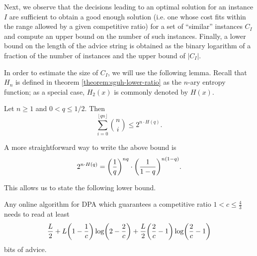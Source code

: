 Next, we observe that the decisions leading to an optimal solution for an
instance $I$ are sufficient to obtain a good enough solution (i.e. one
whose cost fits within the range allowed by a given competitive ratio) for
a set of ``similar'' instances $C_I$ and compute an upper bound on the
number of such instances. Finally, a lower bound on the length of the
advice string is obtained as the binary logarithm of a fraction of the
number of instances and the upper bound of $|C_I|$.

In order to estimate the size of $C_I$, we will use the following lemma.
Recall that $H_n$ is defined in theorem \ref{theorem:sguh-lower-ratio} as
the $n$-ary entropy function; as a special case, $H_2(x)$ is commonly
denoted by $H(x)$.

\begin{lemma}\label{lemma:hamming}
    Let $n \geq 1$ and $0 < q \leq 1/2$. Then
    $$
        \sum_{i=0}^{\lfloor{}qn\rfloor} \binom{n}{i} \leq
        2^{n\cdot{}H(q)}.
    $$
\end{lemma}

A more straightforward way to write the above bound is
$$
    2^{n\cdot{}H(q)} = \paren*{\frac{1}{q}}^{nq} \cdot
    \paren*{\frac{1}{1-q}}^{n(1-q)}.
$$

This allows us to state the following lower bound.

\begin{theorem}\label{theorem:dpa-lower-bound-half}
    Any online algorithm for DPA which guarantees a competitive ratio $1 <
    c \leq \frac{4}{3}$ needs to read at least
    $$\frac{L}{2} + L\paren*{1-\frac{1}{c}}\log\paren*{2-\frac{2}{c}} +
    \frac{L}{2}\paren*{\frac{2}{c}-1}\log\paren*{\frac{2}{c}-1}$$
    bits of advice.
\end{theorem}

